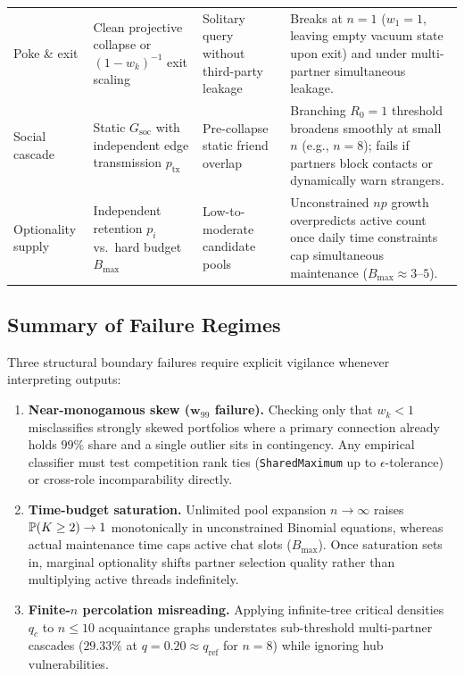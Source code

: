 \begin{table}[htbp]
\begin{tabularx}{\textwidth}{@{}lL@{\hspace{8pt}}LL@{}}
Poke \& exit & Clean projective collapse or $(1-w_k)^{-1}$ exit scaling & Solitary query without third-party leakage & Breaks at $n = 1$ ($w_1 = 1$, leaving empty vacuum state upon exit) and under multi-partner simultaneous leakage. \\
Social cascade & Static $G_{\mathrm{soc}}$ with independent edge transmission $p_{\mathrm{tx}}$ & Pre-collapse static friend overlap & Branching $R_0 = 1$ threshold broadens smoothly at small $n$ (e.g., $n=8$); fails if partners block contacts or dynamically warn strangers. \\
Optionality supply & Independent retention $p_i$ vs.\ hard budget $B_{\max}$ & Low-to-moderate candidate pools & Unconstrained $np$ growth overpredicts active count once daily time constraints cap simultaneous maintenance ($B_{\max} \approx 3$--$5$). \\
\bottomrule
\end{tabularx}
\end{table}

\subsection{Summary of Failure Regimes}
\label{subsec:scope-failures}

Three structural boundary failures require explicit vigilance whenever interpreting \RST{}
outputs:
\begin{enumerate}[nosep]
  \item \textbf{Near-monogamous skew ($\mathbf{w}_{99}$ failure).} Checking only that $w_k < 1$
        misclassifies strongly skewed portfolios where a primary connection already holds $99\%$
        share and a single outlier sits in contingency. Any empirical classifier must test
        competition rank ties (\texttt{SharedMaximum} up to $\epsilon$-tolerance) or cross-role
        incomparability directly.
  \item \textbf{Time-budget saturation.} Unlimited pool expansion $n \to \infty$ raises
        $\mathbb{P}(K \ge 2) \to 1$ monotonically in unconstrained Binomial equations, whereas actual
        maintenance time caps active chat slots ($B_{\max}$). Once saturation sets in, marginal
        optionality shifts partner selection quality rather than multiplying active threads indefinitely.
  \item \textbf{Finite-$n$ percolation misreading.} Applying infinite-tree critical densities
        $q_c$ to $n \le 10$ acquaintance graphs understates sub-threshold multi-partner cascades
        ($29.33\%$ at $q = 0.20 \approx q_{\mathrm{ref}}$ for $n = 8$) while ignoring hub vulnerabilities.
\end{enumerate}
